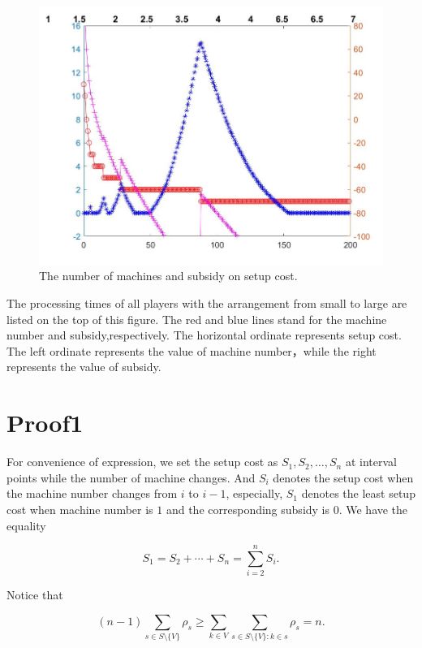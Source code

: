 \documentclass[UTF8]{article}
\begin{document}
\begin{figure}[h]%
	\centering  %
	\includegraphics[width=0.8\linewidth]{Figures/Image30}  %
	\caption{The number of machines and subsidy on setup cost.}  %
	\label{fig:Image11}   %
\end{figure}

The processing times of all players with the arrangement from small to large are listed on the top of this figure.
The red and blue lines stand for the machine number and subsidy,respectively.
The horizontal ordinate represents setup cost.
The left ordinate represents the value of machine number，while the right represents the value of subsidy.

\section{Proof1}

For convenience of expression, we set the setup cost as $S_{1},S_{2}, \dots ,S_{n}$ at interval points while the number of machine changes.
And $S_{i}$ denotes the setup cost when the machine number changes from $i$ to $i-1$, especially, $S_{1}$ denotes the least setup cost when machine number is $1$ and the corresponding subsidy is $0$.
We have the equality

\begin{displaymath}
  S_{1}=S_{2}+\cdots+S_{n}=\sum_{i=2}^n S_i.
\end{displaymath}

Notice that

\begin{displaymath}
  (n-1) \sum_{s \in S \setminus\{V\} } \rho_s \geq
  \sum_{k\in V}\sum_{s \in S \setminus\{V\}:k \in s} \rho_s = n.
\end{displaymath}
\end{document}
